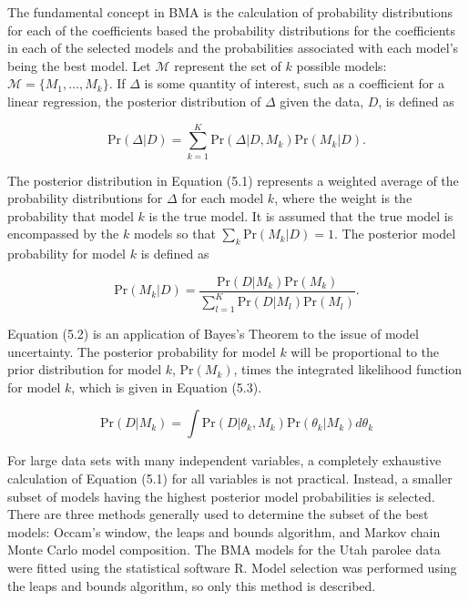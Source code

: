 The fundamental concept in BMA is the calculation of probability distributions for each of the coefficients based the probability distributions for the coefficients in each of the selected models and the probabilities associated with each model's being the best model.  Let $\mathcal{M}$ represent the set of $k$ possible models:  $\mathcal{M} = \{M_1, \ldots, M_k \}$.  If $\Delta$ is some quantity of interest, such as a coefficient for a linear regression, the posterior distribution of $\Delta$ given the data, $D$, is defined as

\begin{equation}
\mbox{Pr}(\Delta | D) = \sum_{k=1}^K \mbox{Pr}(\Delta | D, M_k) \mbox{Pr}(M_k|D).
\end{equation}

The posterior distribution in Equation (5.1) represents a weighted average of the probability distributions for $\Delta$ for each model $k$, where the weight is the probability that model $k$ is the true model.  It is assumed that the true model is encompassed by the $k$ models so that $\sum_k \mbox{Pr}(M_k|D)=1$.  The posterior model probability for model $k$ is defined as

\begin{equation}
\mbox{Pr}(M_k|D) = \frac{\mbox{Pr}(D|M_k) \mbox{Pr}(M_k)}{\sum_{l=1}^K \mbox{Pr}(D|M_l)\mbox{Pr}(M_l)}.
\end{equation}

Equation (5.2) is an application of Bayes's Theorem to the issue of model uncertainty.  The posterior probability for model $k$ will be proportional to the prior distribution for model $k$, Pr$(M_k)$, times the integrated likelihood function for model $k$, which is given in Equation (5.3).

\begin{equation}
\mbox{Pr}(D|M_k) = \int \mbox{Pr}(D|\theta_k, M_k)\mbox{Pr}(\theta_k|M_k) d\theta_k
\end{equation}

For large data sets with many independent variables, a completely exhaustive calculation of Equation (5.1) for all variables is not practical.  Instead, a smaller subset of models having the highest posterior model probabilities is selected.  There are three methods generally used to determine the subset of the best models:  Occam's window, the leaps and bounds algorithm, and Markov chain Monte Carlo model composition.  The BMA models for the Utah parolee data were fitted using the statistical software R.  Model selection was performed using the leaps and bounds algorithm, so only this method is described.

